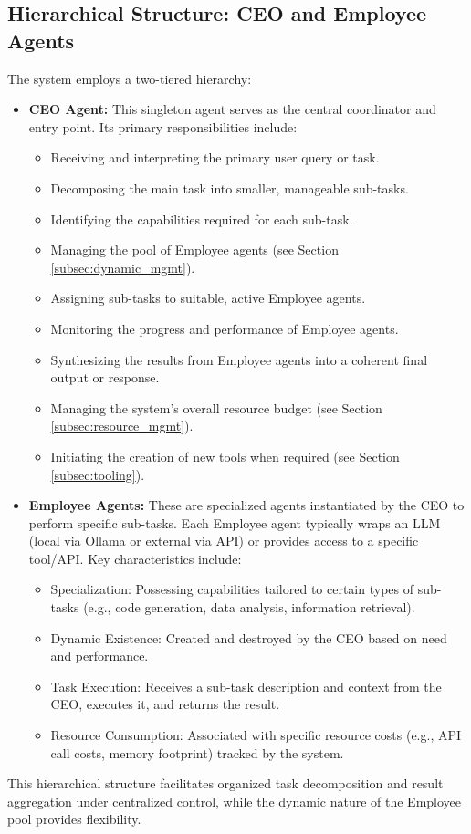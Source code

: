 \documentclass[conference]{IEEEtran}
\begin{document}
\subsection{Hierarchical Structure: CEO and Employee Agents}
The system employs a two-tiered hierarchy:

\begin{itemize}
    \item \textbf{CEO Agent:} This singleton agent serves as the central coordinator and entry point. Its primary responsibilities include:
        \begin{itemize}
            \item Receiving and interpreting the primary user query or task.
            \item Decomposing the main task into smaller, manageable sub-tasks.
            \item Identifying the capabilities required for each sub-task.
            \item Managing the pool of Employee agents (see Section \ref{subsec:dynamic_mgmt}).
            \item Assigning sub-tasks to suitable, active Employee agents.
            \item Monitoring the progress and performance of Employee agents.
            \item Synthesizing the results from Employee agents into a coherent final output or response.
            \item Managing the system's overall resource budget (see Section \ref{subsec:resource_mgmt}).
            \item Initiating the creation of new tools when required (see Section \ref{subsec:tooling}).
        \end{itemize}
    \item \textbf{Employee Agents:} These are specialized agents instantiated by the CEO to perform specific sub-tasks. Each Employee agent typically wraps an LLM (local via Ollama \cite{ollama} or external via API) or provides access to a specific tool/API. Key characteristics include:
        \begin{itemize}
            \item Specialization: Possessing capabilities tailored to certain types of sub-tasks (e.g., code generation, data analysis, information retrieval).
            \item Dynamic Existence: Created and destroyed by the CEO based on need and performance.
            \item Task Execution: Receives a sub-task description and context from the CEO, executes it, and returns the result.
            \item Resource Consumption: Associated with specific resource costs (e.g., API call costs, memory footprint) tracked by the system.
        \end{itemize}
\end{itemize}
This hierarchical structure facilitates organized task decomposition and result aggregation under centralized control, while the dynamic nature of the Employee pool provides flexibility.
\end{document}
